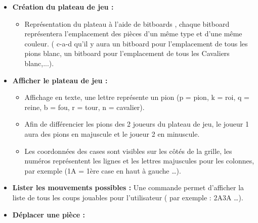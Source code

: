 \documentclass{article}
\begin{document}
\begin{itemize}

\subsection{Liste des besoins fonctionnels}
\medskip

    \item \textbf{Création du plateau de jeu : }
    \medskip
    \begin{itemize}
        \item Représentation du plateau à l'aide de bitboards \cite{Bitboards}, chaque bitboard représentera l'emplacement des pièces d'un même type et d'une même couleur. ( c-a-d qu'il y aura un bitboard pour l'emplacement de tous les pions blanc, un bitboard pour l'emplacement de tous les Cavaliers blanc,...).
    \end{itemize}
    \medskip
    \item \textbf{Afficher le plateau de jeu : }
    \medskip
    \begin{itemize}
        \item Affichage en texte, une lettre représente un pion (p = pion, k = roi, q = reine,
b = fou, r = tour, n = cavalier).
        \item Afin de différencier les pions des 2 joueurs du plateau de jeu, le joueur 1 aura des pions en majuscule et le joueur 2 en minuscule.
        \item Les coordonnées des cases sont visibles sur les côtés de la grille, les numéros représentent les lignes et les lettres majuscules pour les colonnes, par exemple (1A = 1ère case en haut à gauche \dots).
    \end{itemize}
    \medskip
    \item \textbf{Lister les mouvements possibles : }
    \newline
        Une commande permet d'afficher la liste de tous les coups jouables pour l'utilisateur ( par exemple : 2A3A \dots).
    \medskip
    \item \textbf{Déplacer une pièce : }

\end{itemize}
\end{document}
